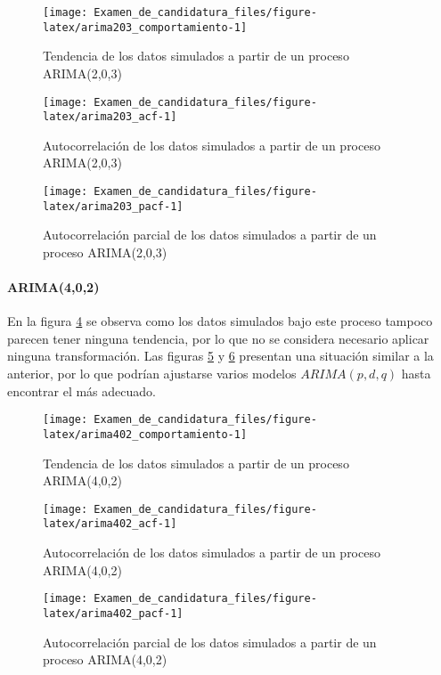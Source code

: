\documentclass[
]{article}
\begin{document}
\begin{figure}[H]
\texttt{[image: Examen\_de\_candidatura\_files/figure-latex/arima203\_comportamiento-1]} \caption{Tendencia de los datos simulados a partir de un proceso ARIMA(2,0,3)}\label{fig:arima203_comportamiento}
\end{figure}

\begin{figure}[H]
\texttt{[image: Examen\_de\_candidatura\_files/figure-latex/arima203\_acf-1]} \caption{Autocorrelación de los datos simulados a partir de un proceso ARIMA(2,0,3)}\label{fig:arima203_acf}
\end{figure}

\begin{figure}[H]
\texttt{[image: Examen\_de\_candidatura\_files/figure-latex/arima203\_pacf-1]} \caption{Autocorrelación parcial de los datos simulados a partir de un proceso ARIMA(2,0,3)}\label{fig:arima203_pacf}
\end{figure}

\paragraph{ARIMA(4,0,2)}

En la figura \ref{fig:arima402_comportamiento} se observa como los datos
simulados bajo este proceso tampoco parecen tener ninguna tendencia, por
lo que no se considera necesario aplicar ninguna transformación. Las
figuras \ref{fig:arima402_acf} y \ref{fig:arima402_pacf} presentan una
situación similar a la anterior, por lo que podrían ajustarse varios
modelos \(ARIMA(p,d,q)\) hasta encontrar el más adecuado.

\begin{figure}[H]
\texttt{[image: Examen\_de\_candidatura\_files/figure-latex/arima402\_comportamiento-1]} \caption{Tendencia de los datos simulados a partir de un proceso ARIMA(4,0,2)}\label{fig:arima402_comportamiento}
\end{figure}

\begin{figure}[H]
\texttt{[image: Examen\_de\_candidatura\_files/figure-latex/arima402\_acf-1]} \caption{Autocorrelación de los datos simulados a partir de un proceso ARIMA(4,0,2)}\label{fig:arima402_acf}
\end{figure}

\begin{figure}[H]
\texttt{[image: Examen\_de\_candidatura\_files/figure-latex/arima402\_pacf-1]} \caption{Autocorrelación parcial de los datos simulados a partir de un proceso ARIMA(4,0,2)}\label{fig:arima402_pacf}
\end{figure}
\end{document}

